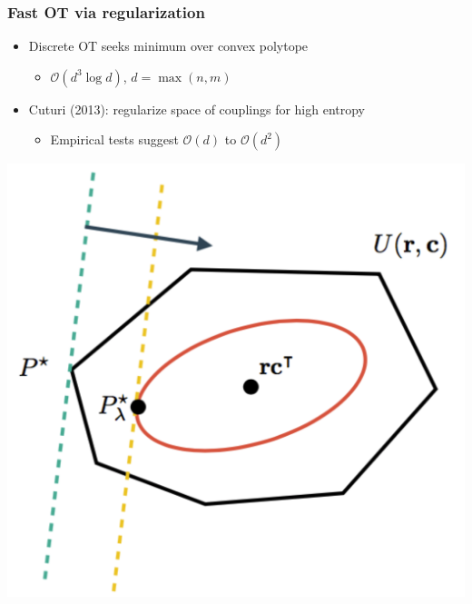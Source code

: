 \documentclass[mathserif,compress,xcolor={dvipsnames}]{beamer}
\renewcommand\;{\,}
\begin{document}
\begin{frame}\frametitle{Fast OT via regularization}
\begin{minipage}{0.49\linewidth}
\begin{itemize}
\item
Discrete OT seeks minimum over convex polytope
\medskip
\begin{itemize}
\item
$\mathcal O(d^3 \log d)$, $d = \max(n, m)$
\end{itemize}
\bigskip
\item
Cuturi (2013): regularize space of couplings for high entropy
\medskip
\begin{itemize}
\item
Empirical tests suggest $\mathcal O(d)$ to $\mathcal O(d^2)$
\end{itemize}
\end{itemize}
\end{minipage}
\begin{minipage}{0.49\linewidth}
\begin{center}
\includegraphics[width=\linewidth]{Images/Sinkhorn_diagram.png}
\end{center}
\end{minipage}
\end{frame}
\end{document}
